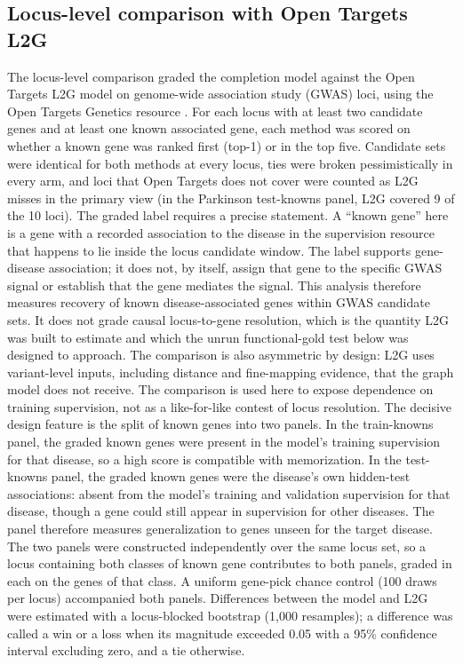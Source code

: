 \documentclass[11pt]{article}
\begin{document}
\subsection{Locus-level comparison with Open Targets L2G}

The locus-level comparison graded the completion model against the Open Targets L2G model \cite{mountjoy2021} on genome-wide association study (GWAS) loci, using the Open Targets Genetics resource \cite{ghoussaini2021,ochoa2021}. For each locus with at least two candidate genes and at least one known associated gene, each method was scored on whether a known gene was ranked first (top-1) or in the top five. Candidate sets were identical for both methods at every locus, ties were broken pessimistically in every arm, and loci that Open Targets does not cover were counted as L2G misses in the primary view (in the Parkinson test-knowns panel, L2G covered 9 of the 10 loci). The graded label requires a precise statement. A ``known gene'' here is a gene with a recorded association to the disease in the supervision resource that happens to lie inside the locus candidate window. The label supports gene-disease association; it does not, by itself, assign that gene to the specific GWAS signal or establish that the gene mediates the signal. This analysis therefore measures recovery of known disease-associated genes within GWAS candidate sets. It does not grade causal locus-to-gene resolution, which is the quantity L2G was built to estimate \cite{mountjoy2021} and which the unrun functional-gold test below was designed to approach. The comparison is also asymmetric by design: L2G uses variant-level inputs, including distance and fine-mapping evidence, that the graph model does not receive. The comparison is used here to expose dependence on training supervision, not as a like-for-like contest of locus resolution. The decisive design feature is the split of known genes into two panels. In the train-knowns panel, the graded known genes were present in the model's training supervision for that disease, so a high score is compatible with memorization. In the test-knowns panel, the graded known genes were the disease's own hidden-test associations: absent from the model's training and validation supervision for that disease, though a gene could still appear in supervision for other diseases. The panel therefore measures generalization to genes unseen for the target disease. The two panels were constructed independently over the same locus set, so a locus containing both classes of known gene contributes to both panels, graded in each on the genes of that class. A uniform gene-pick chance control (100 draws per locus) accompanied both panels. Differences between the model and L2G were estimated with a locus-blocked bootstrap (1,000 resamples); a difference was called a win or a loss when its magnitude exceeded 0.05 with a 95\% confidence interval excluding zero, and a tie otherwise.
\end{document}
